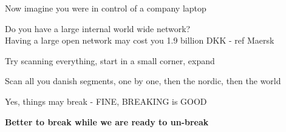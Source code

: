 \documentclass[Screen16to9,17pt,footrule]{foils}
\begin{document}



\begin{list2}
\item Now imagine you were in control of a company laptop
\item Do you have a large internal world wide network?\\
Having a large open network may cost you 1.9 billion DKK - ref Maersk
\item Try scanning everything, start in a small corner, expand
\item Scan all you danish segments, one by one, then the nordic, then the world
\item Yes, things may break - FINE, BREAKING is GOOD
\end{list2}

\centerline{\bf Better to break while we are ready to un-break}


\myquestionspage
\end{document}
